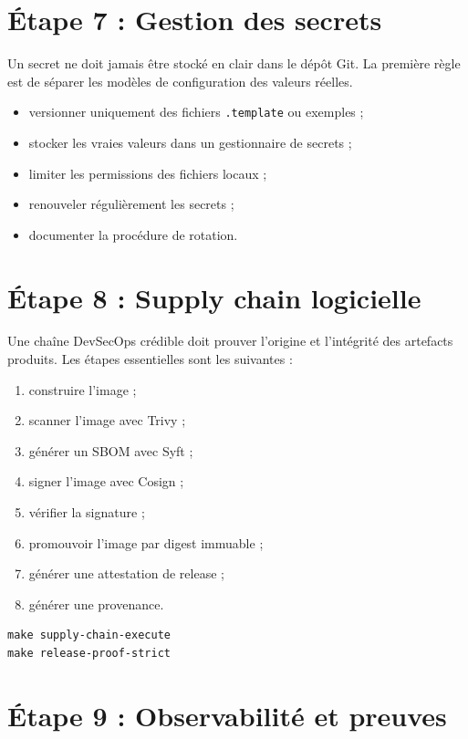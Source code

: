\documentclass[12pt,a4paper]{article}
\begin{document}
\section{Étape 7 : Gestion des secrets}

Un secret ne doit jamais être stocké en clair dans le dépôt Git. La première
règle est de séparer les modèles de configuration des valeurs réelles.

\begin{itemize}[leftmargin=*]
  \item versionner uniquement des fichiers \texttt{.template} ou exemples ;
  \item stocker les vraies valeurs dans un gestionnaire de secrets ;
  \item limiter les permissions des fichiers locaux ;
  \item renouveler régulièrement les secrets ;
  \item documenter la procédure de rotation.
\end{itemize}

\section{Étape 8 : Supply chain logicielle}

Une chaîne DevSecOps crédible doit prouver l'origine et l'intégrité des
artefacts produits. Les étapes essentielles sont les suivantes :

\begin{enumerate}[leftmargin=*]
  \item construire l'image ;
  \item scanner l'image avec Trivy ;
  \item générer un SBOM avec Syft ;
  \item signer l'image avec Cosign ;
  \item vérifier la signature ;
  \item promouvoir l'image par digest immuable ;
  \item générer une attestation de release ;
  \item générer une provenance.
\end{enumerate}

\begin{lstlisting}[style=shellstyle,caption={Exemple de chaîne supply chain}]
make supply-chain-execute
make release-proof-strict
\end{lstlisting}

\section{Étape 9 : Observabilité et preuves}
\end{document}
